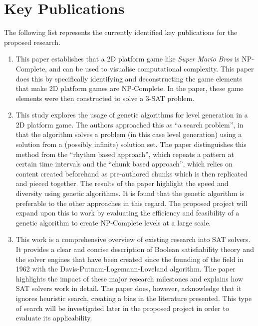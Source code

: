 \documentclass[a4paper]{article}
\begin{document}
\vspace{-5mm}
\section{Key Publications}
\vspace{-5mm}
\par \noindent The following list represents the currently identified key publications for the proposed research.
\begin{enumerate}

  \item {}
  \par \noindent This paper establishes that a 2D platform game like \textit{Super Mario Bros} is NP-Complete, and can be used to visualise computational complexity. This paper does this by specifically identifying and deconstructing the game elements that make 2D platform games are NP-Complete. In the paper, these game elements were then constructed to solve a 3-SAT problem.

  \item {}
  \par \noindent This study explores the usage of genetic algorithms for level generation in a 2D platform game. The authors approached this as ``a search problem'', in that the algorithm solves a problem (in this case level generation) using a solution from a (possibly infinite) solution set. The paper distinguishes this method from the ``rhythm based approach'', which repeats a pattern at certain time intervals and the ``chunk based approach'', which relies on content created beforehand as pre-authored chunks which is then replicated and pieced together. The results of the paper highlight the speed and diversity using genetic algorithms. It is found that the genetic algorithm is preferable to the other approaches in this regard. The proposed project will expand upon this to work by evaluating the efficiency and feasibility of a genetic algorithm to create NP-Complete levels at a large scale.

  \item {}
  \par \noindent This work is a comprehensive overview of existing research into SAT solvers. It provides a clear and concise description of Boolean satisfiability theory and the solver engines that have been created since the founding of the field in 1962 with the Davis-Putnam-Logemann-Loveland algorithm. The paper highlights the impact of these major research milestones and explains how SAT solvers work in detail. The paper does, however, acknowledge that it ignores heuristic search, creating a bias in the literature presented. This type of search will be investigated later in the proposed project in order to evaluate its applicability.


\end{enumerate}
\end{document}
